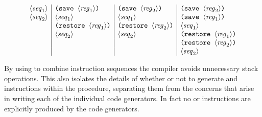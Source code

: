 \[
\begin{array}{l|l|l|l}
\langle \mathit{seq}_1 \rangle & \text{\texttt{(save }} \langle \mathit{reg}_1 \rangle \text{\texttt{)}} & \text{\texttt{(save }} \langle \mathit{reg}_2 \rangle \text{\texttt{)}} & \text{\texttt{(save }} \langle \mathit{reg}_2 \rangle \text{\texttt{)}} \\
\langle \mathit{seq}_2 \rangle & \langle \mathit{seq}_1 \rangle                                          & \langle \mathit{seq}_1 \rangle                                          & \text{\texttt{(save }} \langle \mathit{reg}_1 \rangle \text{\texttt{)}} \\
                               & \text{\texttt{(restore }} \langle \mathit{reg}_1 \rangle \text{\texttt{)}}& \text{\texttt{(restore }} \langle \mathit{reg}_2 \rangle \text{\texttt{)}}& \langle \mathit{seq}_1 \rangle                                          \\
                               & \langle \mathit{seq}_2 \rangle                                          & \langle \mathit{seq}_2 \rangle                                          & \text{\texttt{(restore }} \langle \mathit{reg}_1 \rangle \text{\texttt{)}} \\
                               &                                                                        &                                                                        & \text{\texttt{(restore }} \langle \mathit{reg}_2 \rangle \text{\texttt{)}} \\
                               &                                                                        &                                                                        & \langle \mathit{seq}_2 \rangle
\end{array}
\]


\noindent
By using  to combine instruction sequences the compiler avoids
unnecessary stack operations.  This also isolates the details of whether or not
to generate  and  instructions within the
 procedure, separating them from the concerns that arise in
writing each of the individual code generators.  In fact no  or
 instructions are explicitly produced by the code generators.

